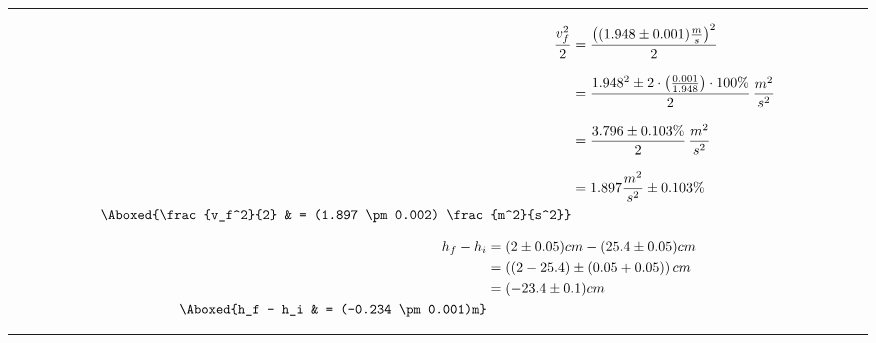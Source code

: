 \documentclass{article}
\newcommand{\fline}{\par\noindent\rule{\textwidth}{0.1pt}} %
\begin{document}
\fline
\vspace{20px}

\noindent\begin{minipage}{.5\linewidth}
    \begin{align*}
        \frac{v_f^2}{2}         & = \frac{\left( (1.948 \pm 0.001) \frac{m}{s} \right)^2}{2}                                        \\[8pt]
                                & = \frac{1.948^2 \pm 2 \cdot \left( \frac{0.001}{1.948} \right) \cdot 100\%}{2} \, \frac{m^2}{s^2} \\[8pt]
                                & = \frac{3.796 \pm 0.103\%}{2} \, \frac{m^2}{s^2}                                                  \\[8pt]
                                & = 1.897 \frac{m^2}{s^2} \pm 0.103\%                                                               \\
        \Aboxed{\frac{v_f^2}{2} & = (1.897 \pm 0.002) \frac{m^2}{s^2}}
    \end{align*}
\end{minipage}
\vline \hfill
\begin{minipage}{.6\linewidth}
    \begin{align*}
        h_f - h_i         & = (2 \pm 0.05)cm - (25.4 \pm 0.05)cm          \\
                          & = \left( (2-25.4) \pm (0.05 + 0.05) \right)cm \\
                          & = (-23.4 \pm 0.1)cm                           \\
        \Aboxed{h_f - h_i & = (-0.234 \pm 0.001)m}
    \end{align*}
\end{minipage}

\vspace{20px}
\fline
\end{document}

